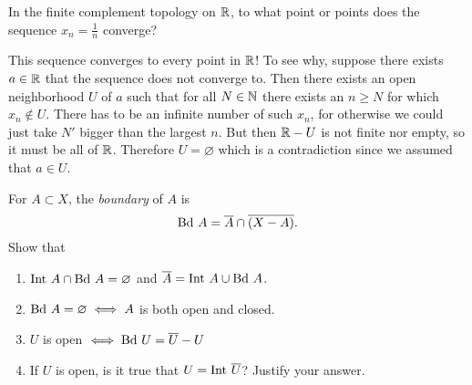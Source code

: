 \begin{ex}{17.14}
    In the finite complement topology on $\mathbb{R}$, to what point or points does the sequence $x_n=\frac1n$ converge?
\end{ex}
\begin{sol}
    This sequence converges to every point in $\mathbb{R}$! To see why, suppose there exists $a\in\mathbb{R}$ that the sequence does not converge to.
    Then there exists an open neighborhood $U$ of $a$ such that for all $N\in\mathbb{N}$ there exists an $n\geq N$ for which $x_n\not\in U$.
    There has to be an infinite number of such $x_n$, for otherwise we could just take $N'$ bigger than the largest $n$. But then $\mathbb{R}-U$ is not finite nor empty, so it must be all of $\mathbb{R}$.
    Therefore $U=\varnothing$ which is a contradiction since we assumed that $a\in U$.
\end{sol}

\begin{ex}{17.19}
    For $A\subset X$, the \textit{boundary} of $A$ is 
    $$\text{Bd } A=\overline{A}\cap\overline{\left(X-A\right)}.$$
    Show that
    \begin{enumerate}
        \item $\text{Int } A\cap \text{Bd } A=\varnothing$ and $\overline{A}=\text{Int } A\cup \text{Bd } A$.
        \item $\text{Bd } A=\varnothing\iff A$ is both open and closed.
        \item $U$ is open $\iff\text{Bd } U = \overline{U}-U$
        \item If $U$ is open, is it true that $U=\text{Int }\overline{U}$? Justify your answer. 
    \end{enumerate}    
\end{ex}

